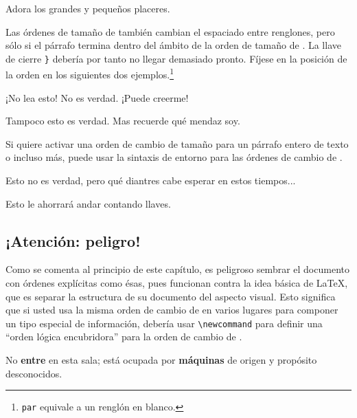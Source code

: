 \begin{example}
Adora los {\LARGE grandes y
{\small pequeños} placeres}. 
\end{example}
 
Las órdenes de tamaño de \fontnomo{} también cambian el espaciado entre renglones, pero sólo si el párrafo termina dentro del ámbito de la orden de tamaño de \fontnomo{}.  La llave de cierre \verb|}| debería por tanto no llegar demasiado pronto.  Fíjese en la posición de la orden  en los siguientes dos ejemplos.\footnote{\texttt{\bs{}par} equivale a un renglón en blanco.}


\begin{example}
{\Large ¡No lea esto!
 No es verdad.
 ¡Puede creerme!\par}
\end{example}

\begin{example}
{\Large Tampoco esto es verdad.
Mas recuerde qué mendaz soy.}\par
\end{example}

Si quiere activar una orden de cambio de tamaño para un párrafo entero de texto o incluso más, puede usar la sintaxis de entorno para las órdenes de cambio de \fontnomo{}.

\begin{example}
\begin{Large} 
Esto no es verdad, pero
qué diantres cabe esperar
en estos tiempos...\par
\end{Large}
\end{example}

Esto le ahorrará andar contando llaves.

\subsection{¡Atención: peligro!}

Como se comenta al principio de este capítulo, es peligroso sembrar el documento con órdenes explícitas como ésas, pues funcionan contra la idea básica de \LaTeX{}, que es separar la estructura de su documento del aspecto visual.  Esto significa que si usted usa la misma orden de cambio de \fontnomo{} en varios lugares para componer un tipo especial de información, debería usar \verb|\newcommand| para definir una ``orden lógica encubridora'' para la orden de cambio de \fontnomo{}.

\begin{example}
\newcommand{\ojo}[1]{%
 \textbf{#1}}
No \ojo{entre} en esta sala; está 
ocupada por \ojo{máquinas} de 
origen y propósito desconocidos.
\end{example}

